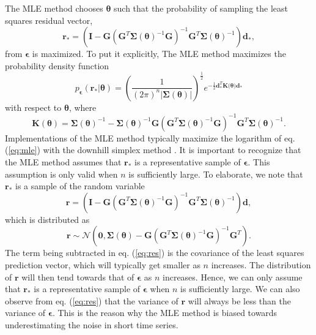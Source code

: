 The MLE method chooses $\mathbf{\theta}$ such that the probability of sampling the least squares residual vector,
\begin{equation}
  \mathbf{r}_* =  \left(\mathbf{I} - 
                  \mathbf{G}\left(\mathbf{G}^T\mathbf{\Sigma}(\mathbf{\theta})^{-1}
                  \mathbf{G}\right)^{-1}\mathbf{G}^T\mathbf{\Sigma}(\mathbf{\theta})^{-1}\right)
                  \mathbf{d_*},
\end{equation}  
from $\mathbf{\epsilon}$ is maximized. To put it explicitly, The MLE method maximizes the probability density function
\begin{equation}\label{eq:mle}
p_\mathbf{\epsilon}(\mathbf{r}_*|\mathbf{\theta}) = 
\left(\frac{1}{(2\pi)^n\left| \mathbf{\Sigma}(\mathbf{\theta}) \right|}\right)^{\frac{1}{2}} 
e^{-\tfrac{1}{2}\mathbf{d}_*^T\mathbf{K(\mathbf{\theta}})\mathbf{d}_*}
\end{equation}
with respect to $\mathbf{\theta}$, where
\begin{equation}
\mathbf{K}(\mathbf{\theta}) = \mathbf{\Sigma}(\mathbf{\theta})^{-1} - 
                              \mathbf{\Sigma}(\mathbf{\theta})^{-1}\mathbf{G}
                              \left(\mathbf{G}^T\mathbf{\Sigma}(\mathbf{\theta})^{-1}\mathbf{G}\right)^{-1}
                              \mathbf{G}^T\mathbf{\Sigma}(\mathbf{\theta})^{-1}.
\end{equation}
Implementations of the MLE method typically maximize the logarithm of eq. (\ref{eq:mle}) with the downhill simplex method \citep{Press2007}. It is important to recognize that the MLE method assumes that $\mathbf{r}_*$ is a representative sample of $\mathbf{\epsilon}$. This assumption is only valid when $n$ is sufficiently large. To elaborate, we note that $\mathbf{r_*}$ is a sample of the random variable
\begin{equation}
  \mathbf{r} =  \left(\mathbf{I} - 
                \mathbf{G}\left(\mathbf{G}^T\mathbf{\Sigma}(\mathbf{\theta})^{-1}\mathbf{G}\right)^{-1}
                \mathbf{G}^T\mathbf{\Sigma}(\mathbf{\theta})^{-1}\right)\mathbf{d},
\end{equation}  
which is distributed as
\begin{equation}\label{eq:res}
  \mathbf{r} \sim \mathcal{N}\left(\mathbf{0},
                  \mathbf{\Sigma}(\mathbf{\theta}) - 
                  \mathbf{G}\left(\mathbf{G}^T\mathbf{\Sigma}(\mathbf{\theta})^{-1}
                  \mathbf{G}\right)^{-1}\mathbf{G}^T\right).
\end{equation}
The term being subtracted in eq. (\ref{eq:res}) is the covariance of the least squares prediction vector, which will typically get smaller as $n$ increases. The distribution of $\mathbf{r}$ will then tend towards that of $\mathbf{\epsilon}$ as $n$ increases. Hence, we can only assume that $\mathbf{r}_*$ is a representative sample of $\mathbf{\epsilon}$ when $n$ is sufficiently large. We can also observe from eq. (\ref{eq:res}) that the variance of $\mathbf{r}$ will always be less than the variance of $\mathbf{\epsilon}$. This is the reason why the MLE method is biased towards underestimating the noise in short time series.

